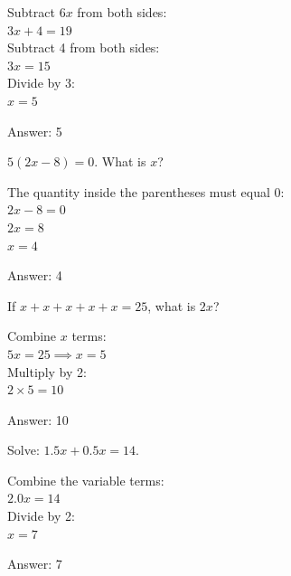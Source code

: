 \documentclass[11pt,paper=a4,answers]{exam}
\begin{document}
\begin{questions}
\begin{solution}
Subtract $6x$ from both sides:
\\[10pt]
$3x + 4 = 19$ 
\\[10pt]
Subtract 4 from both sides:
\\[10pt]
$3x = 15$ 
\\[10pt]
Divide by 3:
\\[10pt]
$x = 5$

\vspace{20pt}
Answer: \colorbox{yellow!100}{5}
\end{solution}

\question
$5(2x - 8) = 0$. What is $x$?

\begin{solution}
The quantity inside the parentheses must equal 0:
\\[10pt]
$2x - 8 = 0$ 
\\[10pt]
$2x = 8$ 
\\[10pt]
$x = 4$

\vspace{20pt}
Answer: \colorbox{yellow!100}{4}
\end{solution}

\question
If $x + x + x + x + x = 25$, what is $2x$?

\begin{solution}
Combine $x$ terms:
\\[10pt]
$5x = 25 \implies x = 5$ 
\\[10pt]
Multiply by 2:
\\[10pt]
$2 \times 5 = 10$

\vspace{20pt}
Answer: \colorbox{yellow!100}{10}
\end{solution}

\question
Solve: $1.5x + 0.5x = 14$.

\begin{solution}
Combine the variable terms:
\\[10pt]
$2.0x = 14$ 
\\[10pt]
Divide by 2:
\\[10pt]
$x = 7$

\vspace{20pt}
Answer: \colorbox{yellow!100}{7}
\end{solution}


\end{questions}
\end{document}
